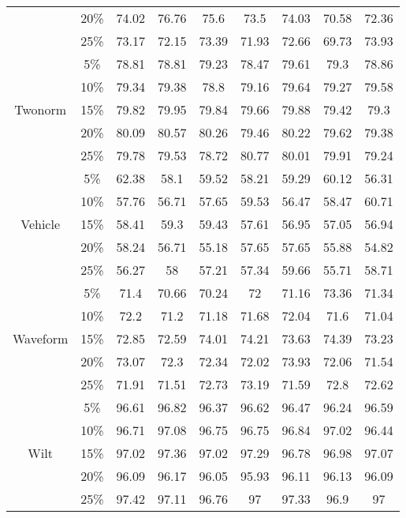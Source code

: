 \begin{longtable}[c]{|c|c|c|c|c|c|c|c|c|}
& 20\% & 74.02 & 76.76 & 75.6 & 73.5 & 74.03 & 70.58 & 72.36 \\
& 25\% & 73.17 & 72.15 & 73.39 & 71.93 & 72.66 & 69.73 & 73.93 \\ \hline
\multirow{5}{*}{Twonorm}
& 5\% & 78.81 & 78.81 & 79.23 & 78.47 & 79.61 & 79.3 & 78.86 \\
& 10\% & 79.34 & 79.38 & 78.8 & 79.16 & 79.64 & 79.27 & 79.58 \\
& 15\% & 79.82 & 79.95 & 79.84 & 79.66 & 79.88 & 79.42 & 79.3 \\
& 20\% & 80.09 & 80.57 & 80.26 & 79.46 & 80.22 & 79.62 & 79.38 \\
& 25\% & 79.78 & 79.53 & 78.72 & 80.77 & 80.01 & 79.91 & 79.24 \\ \hline
\multirow{5}{*}{Vehicle}
& 5\% & 62.38 & 58.1 & 59.52 & 58.21 & 59.29 & 60.12 & 56.31 \\
& 10\% & 57.76 & 56.71 & 57.65 & 59.53 & 56.47 & 58.47 & 60.71 \\
& 15\% & 58.41 & 59.3 & 59.43 & 57.61 & 56.95 & 57.05 & 56.94 \\
& 20\% & 58.24 & 56.71 & 55.18 & 57.65 & 57.65 & 55.88 & 54.82 \\
& 25\% & 56.27 & 58 & 57.21 & 57.34 & 59.66 & 55.71 & 58.71 \\ \hline
\multirow{5}{*}{Waveform}
& 5\% & 71.4 & 70.66 & 70.24 & 72 & 71.16 & 73.36 & 71.34 \\
& 10\% & 72.2 & 71.2 & 71.18 & 71.68 & 72.04 & 71.6 & 71.04 \\
& 15\% & 72.85 & 72.59 & 74.01 & 74.21 & 73.63 & 74.39 & 73.23 \\
& 20\% & 73.07 & 72.3 & 72.34 & 72.02 & 73.93 & 72.06 & 71.54 \\
& 25\% & 71.91 & 71.51 & 72.73 & 73.19 & 71.59 & 72.8 & 72.62 \\ \hline
\multirow{5}{*}{Wilt}
& 5\% & 96.61 & 96.82 & 96.37 & 96.62 & 96.47 & 96.24 & 96.59 \\
& 10\% & 96.71 & 97.08 & 96.75 & 96.75 & 96.84 & 97.02 & 96.44 \\
& 15\% & 97.02 & 97.36 & 97.02 & 97.29 & 96.78 & 96.98 & 97.07 \\
& 20\% & 96.09 & 96.17 & 96.05 & 95.93 & 96.11 & 96.13 & 96.09 \\
& 25\% & 97.42 & 97.11 & 96.76 & 97 & 97.33 & 96.9 & 97 \\ \hline
\end{longtable}

